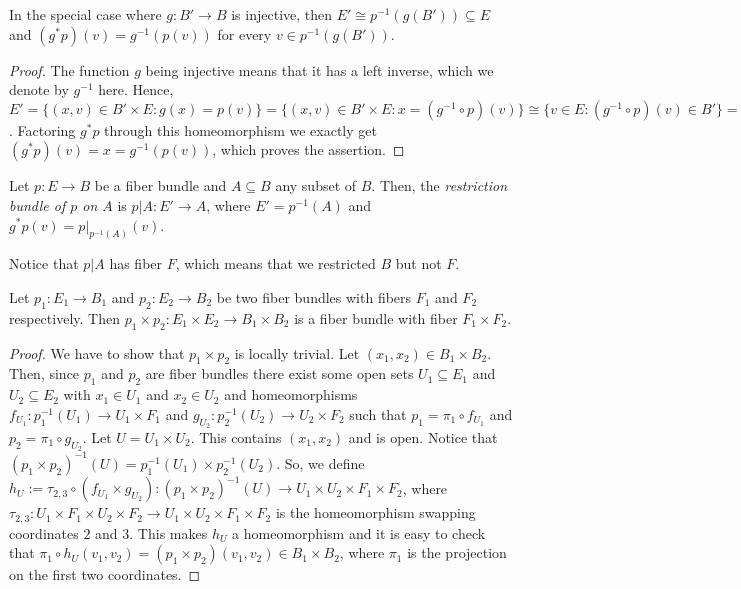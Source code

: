 \begin{remark} In the special case where $g:B'\to B$ is injective, then $E'\cong p^{-1}(g(B'))\subseteq E$ and $(g^*p)(v)=g^{-1}(p(v))$ for every $v\in p^{-1}(g(B'))$.
\end{remark}
\begin{proof} The function $g$ being injective means that it has a left inverse, which we denote by $g^{-1}$ here. Hence,
$E'=\{(x,v)\in B'\times E:g(x)=p(v)\}=\{(x,v)\in B'\times E:x=(g^{-1}\circ p)(v)\}
\cong\{v\in E:(g^{-1}\circ p)(v)\in B'\}=p^{-1}(g(B))$.
Factoring $g^*p$ through this homeomorphism we exactly get $(g^*p)(v)=x=g^{-1}(p(v))$, which proves the assertion.
\end{proof}

\begin{definition} Let $p:E\to B$ be a fiber bundle and $A\subseteq B$ any subset of $B$. Then, the \emph{restriction bundle of $p$ on $A$} is $p|A:E'\to A$, where $E'=p^{-1}(A)$ and $g^*p(v)=p|_{p^{-1}(A)}(v)$.
\end{definition}
Notice that $p|A$ has fiber $F$, which means that we restricted $B$ but not $F$.

\begin{proposition} Let $p_1:E_1\to B_1$ and $p_2:E_2\to B_2$ be two fiber bundles with fibers $F_1$ and $F_2$ respectively. Then $p_1\times p_2:E_1\times E_2\to B_1\times B_2$ is a fiber bundle with fiber $F_1\times F_2$.
\end{proposition}
\begin{proof} We have to show that $p_1\times p_2$ is locally trivial. Let $(x_1,x_2)\in B_1\times B_2$. Then, since $p_1$ and $p_2$ are fiber bundles there exist some open sets $U_1\subseteq E_1$ and $U_2\subseteq E_2$ with $x_1\in U_1$ and $x_2\in U_2$ and homeomorphisms $f_{U_1}:p_1^{-1}(U_1)\to U_1\times F_1$ and $g_{U_2}:p_2^{-1}(U_2)\to U_2\times F_2$ such that $p_1=\pi_1\circ f_{U_1}$ and $p_2=\pi_1\circ g_{U_2}$. Let $U=U_1\times U_2$. This contains $(x_1,x_2)$ and is open. Notice that $(p_1\times p_2)^{-1}(U)=p_1^{-1}(U_1)\times p_2^{-1}(U_2)$. So, we define $h_U:=\tau_{2,3}\circ(f_{U_1}\times g_{U_2}):(p_1\times p_2)^{-1}(U)\to U_1\times U_2\times F_1\times F_2$, where $\tau_{2,3}:U_1\times F_1\times U_2\times F_2\to U_1\times U_2\times F_1\times F_2$ is the homeomorphism swapping coordinates $2$ and $3$. This makes $h_U$ a homeomorphism and it is easy to check that $\pi_1\circ h_U(v_1,v_2)=(p_1\times p_2)(v_1,v_2)\in B_1\times B_2$, where $\pi_1$ is the projection on the first two coordinates.
\end{proof}

